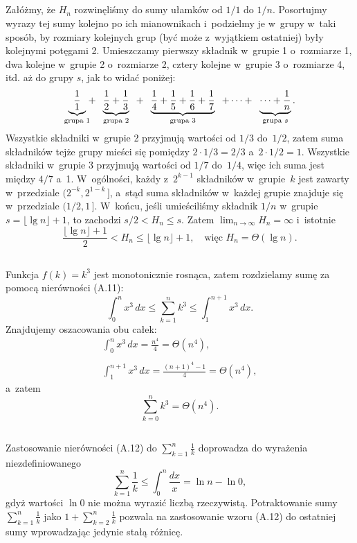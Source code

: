 \subsection{} %
Załóżmy, że $H_n$ rozwinęliśmy do sumy ułamków od $1/1$ do $1/n$. Posortujmy wyrazy tej sumy kolejno po ich mianownikach i~podzielmy je w~grupy w~taki sposób, by rozmiary kolejnych grup (być może z~wyjątkiem ostatniej) były kolejnymi potęgami 2. Umieszczamy pierwszy składnik w~grupie 1 o~rozmiarze 1, dwa kolejne w~grupie 2 o~rozmiarze 2, cztery kolejne w~grupie 3 o~rozmiarze 4, itd. aż do grupy $s$, jak to widać poniżej:
\[
	\underbrace{\frac{1}{1}}_{\text{\scriptsize grupa 1}}\!\!+\;\;\underbrace{\frac{1}{2}+\frac{1}{3}}_{\text{\scriptsize grupa 2}}\;\;+\;\;\underbrace{\frac{1}{4}+\frac{1}{5}+\frac{1}{6}+\frac{1}{7}}_{\text{\scriptsize grupa 3}}\;\;+\cdots+\;\;\underbrace{\cdots +\frac{1}{n}}_{\text{\scriptsize grupa $s$}}.
\]
Wszystkie składniki w~grupie 2 przyjmują wartości od $1/3$ do~$1/2$, zatem suma składników tejże grupy mieści się pomiędzy $2\cdot1/3=2/3$ a~$2\cdot1/2=1$. Wszystkie składniki w~grupie 3 przyjmują wartości od $1/7$ do~$1/4$, więc ich suma jest między $4/7$ a~1. W~ogólności, każdy z~$2^{k-1}$ składników w~grupie~$k$ jest zawarty w~przedziale $\bigl(2^{-k},2^{1-k}\,\bigr]$, a~stąd suma składników w~każdej grupie znajduje się w~przedziale $(1/2,1\,]$. W~końcu, jeśli umieściliśmy składnik $1/n$ w~grupie $s = \lfloor\lg n\rfloor+1$, to zachodzi $s/2<H_n\le s$. Zatem $\lim_{n\to\infty}H_n=\infty$ i~istotnie
\[
	\frac{\lfloor\lg n\rfloor+1}{2} < H_n \le \lfloor\lg n\rfloor+1, \quad\text{więc }H_n = \Theta(\lg n).
\]

\subsection{} %
Funkcja $f(k)=k^3$ jest monotonicznie rosnąca, zatem rozdzielamy sumę za pomocą nierówności (A.11):
\[
	\int_0^nx^3\,dx \le \sum_{k=1}^nk^3 \le \int_1^{n+1}x^3\,dx.
\]
Znajdujemy oszacowania obu całek:
\begin{gather*}
	\int_0^nx^3\,dx = \frac{n^4}{4} = \Theta(n^4), \\\\
	\int_1^{n+1}x^3\,dx = \frac{(n+1)^4-1}{4} = \Theta(n^4),
\end{gather*}
a~zatem
\[
	\sum_{k=0}^nk^3 = \Theta(n^4).
\]

\subsection{} %
Zastosowanie nierówności (A.12) do $\sum_{k=1}^n\frac{1}{k}$ doprowadza do wyrażenia niezdefiniowanego
\[
	\sum_{k=1}^n\frac{1}{k} \le \int_0^n\frac{dx}{x} = \ln n-\ln 0,
\]
gdyż wartości $\ln0$ nie można wyrazić liczbą rzeczywistą. Potraktowanie sumy $\sum_{k=1}^n\frac{1}{k}$ jako $1+\sum_{k=2}^n\frac{1}{k}$ pozwala na zastosowanie wzoru (A.12) do ostatniej sumy wprowadzając jedynie stałą różnicę.

